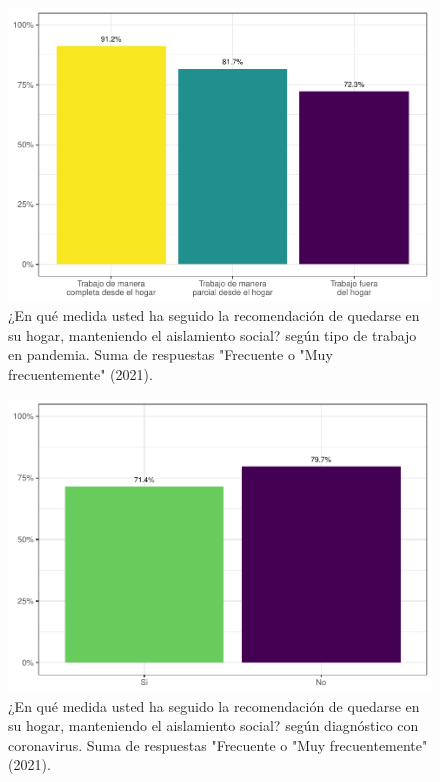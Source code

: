 \documentclass[
  12pt,
  openany]{book}
\begin{document}
\begin{figure}

{\centering \includegraphics{reporte-elsoc_files/figure-latex/dist-telet-1} 

}

\caption{¿En qué medida usted ha seguido la recomendación de quedarse en su hogar, manteniendo el aislamiento social? según tipo de trabajo en pandemia. Suma de respuestas "Frecuente o "Muy frecuentemente" (2021).}\label{fig:dist-telet}
\end{figure}
\begin{figure}

{\centering \includegraphics{reporte-elsoc_files/figure-latex/dist-covid-1} 

}

\caption{¿En qué medida usted ha seguido la recomendación de quedarse en su hogar, manteniendo el aislamiento social? según diagnóstico con coronavirus. Suma de respuestas "Frecuente o "Muy frecuentemente" (2021).}\label{fig:dist-covid}
\end{figure}
\end{document}
